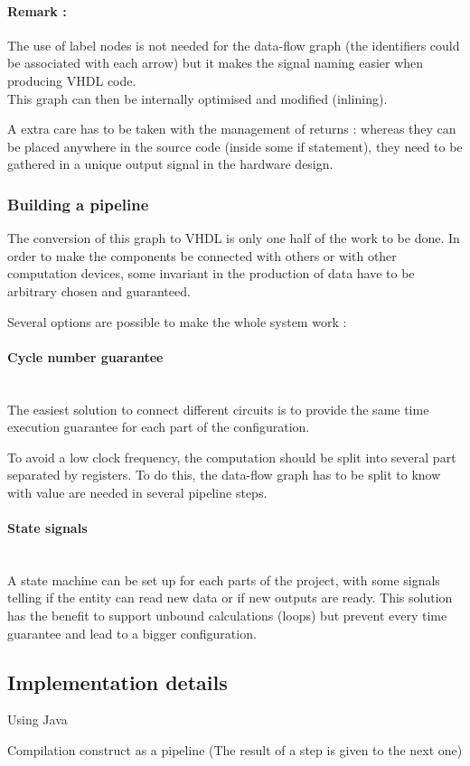 \documentclass[10pt,a4paper]{article}
\begin{document}
\paragraph{Remark :} The use of label nodes is not needed for the data-flow graph (the identifiers could be associated with each arrow) but it makes the signal naming easier when producing VHDL code. \\


This graph can then be internally  optimised and modified (inlining).

A extra care has to be taken with the management of returns : whereas they can be placed anywhere in the source code (inside some if statement), they need to be gathered in a unique output signal in the hardware design.

\subsubsection{Building a pipeline}

\label{Opts}

The conversion of this graph to VHDL is only one half of the work to be done. In order to make the components be connected with others or with other computation devices, some invariant in the production of data have to be arbitrary chosen and guaranteed.

Several options are possible to make the whole system work :

\paragraph{Cycle number guarantee}
~\\
The easiest solution to connect different circuits is to provide the same time execution guarantee for each part of the configuration. 

To avoid a low clock frequency, the computation should be split into several part separated by registers. To do this, the data-flow graph has to be split to know with value are needed in several pipeline steps.


\paragraph{State signals}
~\\
A state machine can be set up for each parts of the project, with some signals telling if the entity can read new data or if new outputs are ready. This solution has the benefit to support unbound calculations (loops) but prevent every time guarantee and lead to a bigger configuration.



\subsection{Implementation details}

Using Java

Compilation construct as a pipeline (The result of a step is given to the next one)
 
 
 
 
 
 
\end{document}
